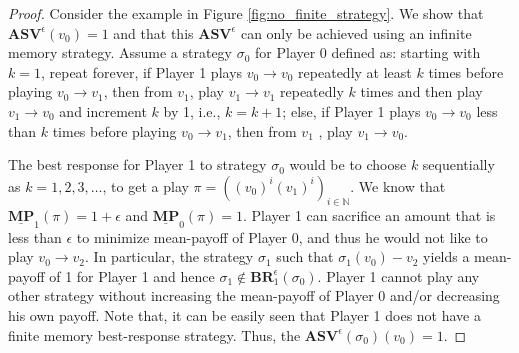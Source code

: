 \begin{proof}
Consider the example in Figure \ref{fig:no_finite_strategy}. We show that $\mathbf{ASV}^{\epsilon}(v_0) = 1$ and that this $\mathbf{ASV}^{\epsilon}$ can only be achieved using an infinite memory strategy. Assume a strategy $\sigma_0$ for Player 0 defined as: starting with $k=1$, repeat forever, if Player 1 plays $v_0 \to v_0$ repeatedly at least $k$ times before playing $v_0 \to v_1$, then from $v_1$, play $v_1 \to v_1$ repeatedly $k$ times and then play $v_1 \to v_0$ and increment $k$ by 1, i.e., $k=k+1$; else, if Player 1 plays $v_0 \to v_0$ less than $k$ times before playing $v_0 \to v_1$, then from $v_1$ , play $v_1 \to v_0$.

The best response for Player 1 to strategy $\sigma_0$ would be to choose $k$ sequentially as $k = 1, 2, 3, \dotsc$, to get a play $\pi = ((v_0)^i(v_1)^i)_{i \in \mathbb{N}}$. We know that $\underline{\mathbf{MP}}_1(\pi) = 1+\epsilon$ and $\underline{\mathbf{MP}}_0(\pi) = 1$. Player 1 can sacrifice an amount that is less than $\epsilon$ to minimize mean-payoff of Player 0, and thus he would not like to play $v_0 \to v_2$. In particular, the strategy $\sigma_1$ such that $\sigma_1(v_0) - v_2$ yields a mean-payoff of 1 for Player 1 and hence $\sigma_1 \notin \mathbf{BR}_1^{\epsilon}(\sigma_0)$. Player 1 cannot play any other strategy without increasing the mean-payoff of Player 0 and/or decreasing his own payoff. Note that, it can be easily seen that Player 1 does not have a finite memory best-response strategy. Thus, the $\mathbf{ASV}^{\epsilon}(\sigma_0)(v_0) = 1$.



\end{proof}
